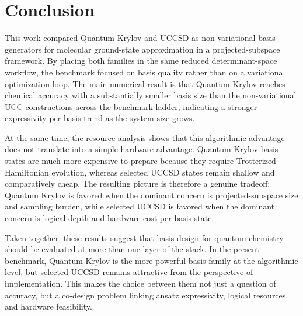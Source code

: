 \section{Conclusion}

This work compared Quantum Krylov and UCCSD as non-variational basis generators for
molecular ground-state approximation in a projected-subspace framework. By
placing both families in the same reduced determinant-space workflow, the
benchmark focused on basis quality rather than on a variational optimization
loop. The main numerical result is that Quantum Krylov reaches chemical accuracy with a
substantially smaller basis size than the non-variational UCC constructions
across the benchmark ladder, indicating a stronger expressivity-per-basis trend
as the system size grows.

At the same time, the resource analysis shows that this algorithmic advantage
does not translate into a simple hardware advantage. Quantum Krylov basis states are
much more expensive to prepare because they require Trotterized Hamiltonian
evolution, whereas selected UCCSD states remain shallow and comparatively
cheap. The resulting picture is therefore a genuine tradeoff: Quantum Krylov is favored
when the dominant concern is projected-subspace size and sampling burden, while
selected UCCSD is favored when the dominant concern is logical depth and
hardware cost per basis state.

Taken together, these results suggest that basis design for quantum chemistry
should be evaluated at more than one layer of the stack. In the present
benchmark, Quantum Krylov is the more powerful basis family at the algorithmic level,
but selected UCCSD remains attractive from the perspective of implementation.
This makes the choice between them not just a question of accuracy, but a
co-design problem linking ansatz expressivity, logical resources, and hardware
feasibility.
